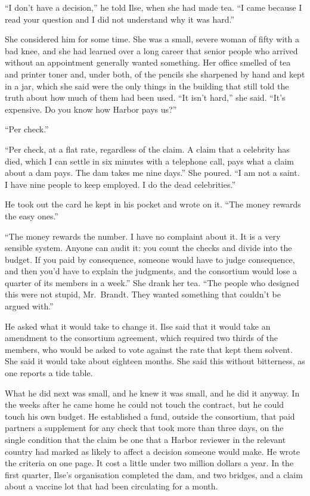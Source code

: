 ``I don't have a decision,'' he told Ilse, when she had made tea. ``I came because I read your question and I did not understand why it was hard.''

She considered him for some time. She was a small, severe woman of fifty with a bad knee, and she had learned over a long career that senior people who arrived without an appointment generally wanted something. Her office smelled of tea and printer toner and, under both, of the pencils she sharpened by hand and kept in a jar, which she said were the only things in the building that still told the truth about how much of them had been used. ``It isn't hard,'' she said. ``It's expensive. Do you know how Harbor pays us?''

``Per check.''

``Per check, at a flat rate, regardless of the claim. A claim that a celebrity has died, which I can settle in six minutes with a telephone call, pays what a claim about a dam pays. The dam takes me nine days.'' She poured. ``I am not a saint. I have nine people to keep employed. I do the dead celebrities.''

He took out the card he kept in his pocket and wrote on it. ``The money rewards the easy ones.''

``The money rewards the number. I have no complaint about it. It is a very sensible system. Anyone can audit it: you count the checks and divide into the budget. If you paid by consequence, someone would have to judge consequence, and then you'd have to explain the judgments, and the consortium would lose a quarter of its members in a week.'' She drank her tea. ``The people who designed this were not stupid, Mr.~Brandt. They wanted something that couldn't be argued with.''

He asked what it would take to change it. Ilse said that it would take an amendment to the consortium agreement, which required two thirds of the members, who would be asked to vote against the rate that kept them solvent. She said it would take about eighteen months. She said this without bitterness, as one reports a tide table.

What he did next was small, and he knew it was small, and he did it anyway. In the weeks after he came home he could not touch the contract, but he could touch his own budget. He established a fund, outside the consortium, that paid partners a supplement for any check that took more than three days, on the single condition that the claim be one that a Harbor reviewer in the relevant country had marked as likely to affect a decision someone would make. He wrote the criteria on one page. It cost a little under two million dollars a year. In the first quarter, Ilse's organisation completed the dam, and two bridges, and a claim about a vaccine lot that had been circulating for a month.

